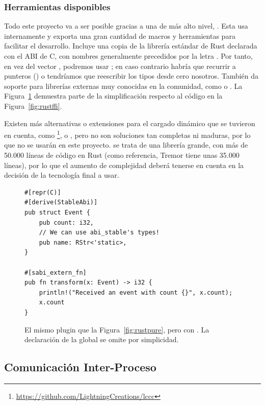 \subsubsection{Herramientas disponibles}

Todo este proyecto va a ser posible gracias a una \crate de más alto nivel,
. Esta usa  internamente y exporta una
gran cantidad de macros y herramientas para facilitar el desarrollo. Incluye una
copia de la librería estándar de Rust declarada con el ABI de C, con nombres
generalmente precedidos por la letra . Por tanto, en vez del vector
, podremos usar ; en caso contrario habría que
recurrir a punteros () o tendríamos que reescribir los tipos
desde cero nosotros. También da soporte para librerías externas muy conocidas en
la comunidad, como  o . La
Figura~\ref{fig:rustabi_stable} demuestra parte de la simplificación respecto al
código en la Figura~\ref{fig:rustffi}.

Existen más alternativas o extensiones para el cargado dinámico que se tuvieron
en cuenta, como
\footnote{\url{https://github.com/LightningCreations/lccc}},
 o , pero no son soluciones tan completas
ni maduras, por lo que no se usarán en este proyecto. \abistable se trata de una
librería grande, con más de 50.000 líneas de código en Rust (como referencia,
Tremor tiene unas 35.000 líneas), por lo que el aumento de complejidad deberá
tenerse en cuenta en la decisión de la tecnología final a usar.

\begin{figure}
    \centering
    \begin{verbatim}
#[repr(C)]
#[derive(StableAbi)]
pub struct Event {
    pub count: i32,
    // We can use abi_stable's types!
    pub name: RStr<'static>,
}

#[sabi_extern_fn]
pub fn transform(x: Event) -> i32 {
    println!("Received an event with count {}", x.count);
    x.count
}
    \end{verbatim}

    \caption{El mismo plugin que la Figura~\ref{fig:rustpure}, pero con
        \abistable. La declaración de la global  se omite por
        simplicidad.}%
    \label{fig:rustabi_stable}
\end{figure}

\subsection{Comunicación Inter-Proceso}


